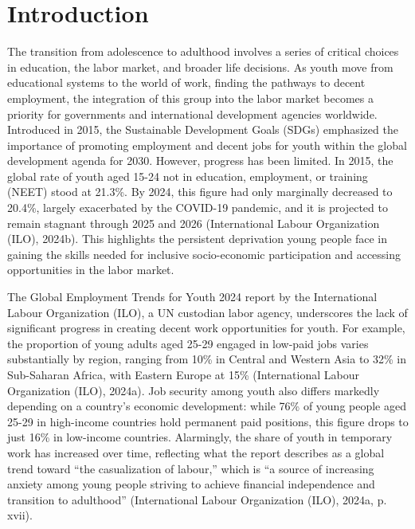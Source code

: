 \documentclass[
]{interact}
\begin{document}
\newpage

\section{Introduction}\label{introduction}

The transition from adolescence to adulthood involves a series of
critical choices in education, the labor market, and broader life
decisions. As youth move from educational systems to the world of work,
finding the pathways to decent employment, the integration of this group
into the labor market becomes a priority for governments and
international development agencies worldwide. Introduced in 2015, the
Sustainable Development Goals (SDGs) emphasized the importance of
promoting employment and decent jobs for youth within the global
development agenda for 2030. However, progress has been limited. In
2015, the global rate of youth aged 15-24 not in education, employment,
or training (NEET) stood at 21.3\%. By 2024, this figure had only
marginally decreased to 20.4\%, largely exacerbated by the COVID-19
pandemic, and it is projected to remain stagnant through 2025 and 2026
(International Labour Organization (ILO), 2024b). This highlights the
persistent deprivation young people face in gaining the skills needed
for inclusive socio-economic participation and accessing opportunities
in the labor market.

The Global Employment Trends for Youth 2024 report by the International
Labour Organization (ILO), a UN custodian labor agency, underscores the
lack of significant progress in creating decent work opportunities for
youth. For example, the proportion of young adults aged 25-29 engaged in
low-paid jobs varies substantially by region, ranging from 10\% in
Central and Western Asia to 32\% in Sub-Saharan Africa, with Eastern
Europe at 15\% (International Labour Organization (ILO), 2024a). Job
security among youth also differs markedly depending on a country's
economic development: while 76\% of young people aged 25-29 in
high-income countries hold permanent paid positions, this figure drops
to just 16\% in low-income countries. Alarmingly, the share of youth in
temporary work has increased over time, reflecting what the report
describes as a global trend toward ``the casualization of labour,''
which is ``a source of increasing anxiety among young people striving to
achieve financial independence and transition to adulthood''
(International Labour Organization (ILO), 2024a, p. xvii).
\end{document}
